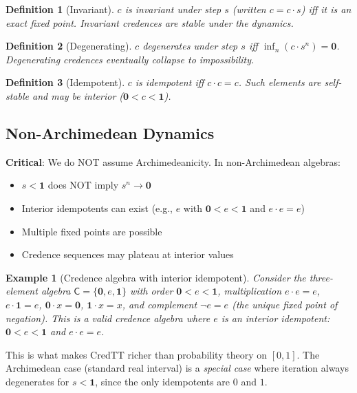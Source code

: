 \documentclass[11pt,a4paper]{article}
\newtheorem{definition}{Definition}[section]
\newtheorem{example}[theorem]{Example}
\newcommand{\C}{\mathsf{C}}
\newcommand{\one}{\mathbf{1}}
\newcommand{\zero}{\mathbf{0}}
\newcommand{\negc}{\neg}
\begin{document}
\begin{definition}[Invariant]
$c$ is \emph{invariant} under step $s$ (written $c = c \cdot s$) iff it is an exact fixed point. Invariant credences are \emph{stable} under the dynamics.
\end{definition}

\begin{definition}[Degenerating]
$c$ \emph{degenerates} under step $s$ iff $\inf_n (c \cdot s^n) = \zero$. Degenerating credences eventually collapse to impossibility.
\end{definition}

\begin{definition}[Idempotent]
$c$ is \emph{idempotent} iff $c \cdot c = c$. Such elements are self-stable and may be \emph{interior} ($\zero < c < \one$).
\end{definition}

\subsection{Non-Archimedean Dynamics}

\textbf{Critical}: We do NOT assume Archimedeanicity. In non-Archimedean algebras:
\begin{itemize}
    \item $s < \one$ does NOT imply $s^n \to \zero$
    \item Interior idempotents can exist (e.g., $e$ with $\zero < e < \one$ and $e \cdot e = e$)
    \item Multiple fixed points are possible
    \item Credence sequences may plateau at interior values
\end{itemize}

\begin{example}[Credence algebra with interior idempotent]
Consider the three-element algebra $\C = \{\zero, e, \one\}$ with order $\zero < e < \one$, multiplication $e \cdot e = e$, $e \cdot \one = e$, $\zero \cdot x = \zero$, $\one \cdot x = x$, and complement $\negc e = e$ (the unique fixed point of negation). This is a valid credence algebra where $e$ is an interior idempotent: $\zero < e < \one$ and $e \cdot e = e$.
\end{example}

This is what makes CredTT richer than probability theory on $[0,1]$. The Archimedean case (standard real interval) is a \emph{special case} where iteration always degenerates for $s < \one$, since the only idempotents are $0$ and $1$.
\end{document}
